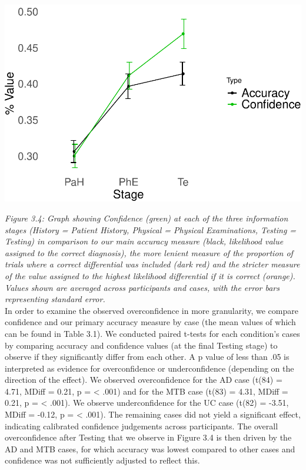 \documentclass[a4paper, nobind]{templates/ociamthesis}
\begin{document}
\begin{center}\includegraphics[width=1\linewidth]{_main_files/figure-latex/meyerGraph-1} \end{center}

\emph{Figure 3.4: Graph showing Confidence (green) at each of the three information stages (History = Patient History, Physical = Physical Examinations, Testing = Testing) in comparison to our main accuracy measure (black, likelihood value assigned to the correct diagnosis), the more lenient measure of the proportion of trials where a correct differential was included (dark red) and the stricter measure of the value assigned to the highest likelihood differential if it is correct (orange). Values shown are averaged across participants and cases, with the error bars representing standard error.}\\

In order to examine the observed overconfidence in more granularity, we compare confidence and our primary accuracy measure by case (the mean values of which can be found in Table 3.1). We conducted paired t-tests for each condition's cases by comparing accuracy and confidence values (at the final Testing stage) to observe if they significantly differ from each other. A p value of less than .05 is interpreted as evidence for overconfidence or underconfidence (depending on the direction of the effect). We observed overconfidence for the AD case (t(84) = 4.71, MDiff = 0.21, p = \textless{} .001) and for the MTB case (t(83) = 4.31, MDiff = 0.21, p = \textless{} .001). We observe underconfidence for the UC case (t(82) = -3.51, MDiff = -0.12, p = \textless{} .001). The remaining cases did not yield a significant effect, indicating calibrated confidence judgements across participants. The overall overconfidence after Testing that we observe in Figure 3.4 is then driven by the AD and MTB cases, for which accuracy was lowest compared to other cases and confidence was not sufficiently adjusted to reflect this.
\end{document}
